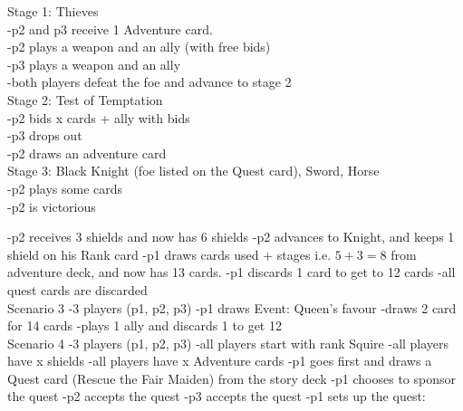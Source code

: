 \documentclass[12pt]{article} %
\begin{document}
	\begin{addmargin}[1cm]{0em}
	Stage 1: Thieves\\
	-p2 and p3 receive 1 Adventure card.\\
	-p2 plays a weapon and an ally (with free bids)\\
	-p3 plays a weapon and an ally\\
	-both players defeat the foe and advance to stage 2\\
	
	Stage 2: Test of Temptation\\
	-p2 bids x cards + ally with bids\\
	-p3 drops out\\
	-p2 draws an adventure card\\
	
	Stage 3: Black Knight (foe listed on the Quest card), Sword, Horse\\
	-p2 plays some cards\\
	-p2 is victorious\\
	\end{addmargin}

\bgroup\obeylines
-p2 receives 3 shields and now has 6 shields
-p2 advances to Knight, and keeps 1 shield on his Rank card
-p1 draws cards used + stages i.e. $5 + 3 = 8$ from adventure deck, and now has 13 cards.
-p1 discards 1 card to get to 12 cards
-all quest cards are discarded\\

Scenario 3
-3 players (p1, p2, p3)
-p1 draws Event: Queen's favour
-draws 2 card for 14 cards
-plays 1 ally and discards 1 to get 12\\

Scenario 4
-3 players (p1, p2, p3)
-all players start with rank Squire
-all players have x shields
-all players have x Adventure cards
-p1 goes first and draws a Quest card (Rescue the Fair Maiden) from the story deck
-p1 chooses to sponsor the quest
-p2 accepts the quest
-p3 accepts the quest
-p1 sets up the quest:\\
\egroup
	
\end{document}
